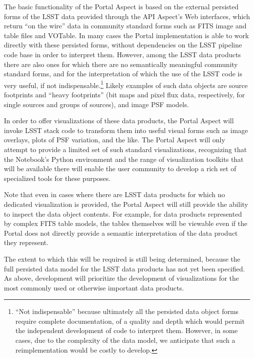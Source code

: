 The basic functionality of the Portal Aspect is based on the external persisted forms of the LSST data provided through the API Aspect's Web interfaces, which return ``on the wire'' data in community standard forms such as FITS image and table files and VOTable.
In many cases the Portal implementation is able to work directly with these persisted forms, without dependencies on the LSST pipeline code base in order to interpret them.
However, among the LSST data products there are also ones for which there are no semantically meaningful community standard forms, and for the interpretation of which the use of the LSST code is very useful, if not indispensable.\footnote{``Not indispensable'' because ultimately all the persisted data object forms require complete documentation, of a quality and depth which would permit the independent development of code to interpret them.  However, in some cases, due to the complexity of the data model, we anticipate that such a reimplementation would be costly to develop.}
Likely examples of such data objects are source footprints and ``heavy footprints'' (bit maps and pixel flux data, respectively, for single sources and groups of sources), and image PSF models.

In order to offer visualizations of these data products, the Portal Aspect will invoke LSST stack code to transform them into useful visual forms such as image overlays, plots of PSF variation, and the like.
The Portal Aspect will only attempt to provide a limited set of such standard visualizations, recognizing that the Notebook's Python environment and the range of visualization toolkits that will be available there will enable the user community to develop a rich set of specialized tools for these purposes.

Note that even in cases where there are LSST data products for which no dedicated visualization is provided, the Portal Aspect will still provide the ability to inspect the data object contents.
For example, for data products represented by complex FITS table models, the tables themselves will be viewable even if the Portal does not directly provide a semantic interpretation of the data product they represent.

The extent to which this will be required is still being determined, because the full persisted data model for the LSST data products has not yet been specified.
As above, development will prioritize the development of visualizations for the most commonly used or otherwise important data products.

